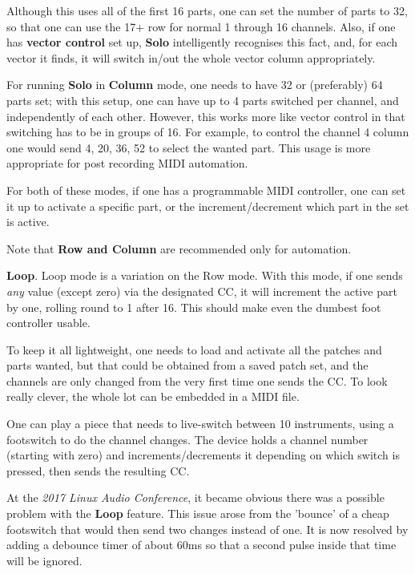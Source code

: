    Although this uses all of the first 16 parts, one can set the number of
   parts to 32, so that one can use the 17+ row for normal 1 through 16
   channels. Also, if one has \textbf{vector control} set up, \textbf{Solo}
   intelligently recognises this fact, and, for each vector it finds, it will
   switch in/out the whole vector column appropriately.

   For running \textbf{Solo} in \textbf{Column} mode, one needs to have 32 or
   (preferably) 64 parts set; with this setup, one can have up to 4 parts
   switched per channel, and independently of each other. However, this works
   more like vector control in that switching has to be in groups of 16. For
   example, to control the channel 4 column one would send 4, 20, 36, 52 to
   select the wanted part. This usage is more appropriate for post recording
   MIDI automation.

   For both of these modes, if one has a programmable MIDI controller, one can
   set it up to activate a specific part, or the increment/decrement which part
   in the set is active.

   Note that \textbf{Row and Column} are recommended only for automation.

   \textbf{Loop}.  Loop mode is a variation on the Row mode.
   With this mode, if one sends \textsl{any} value (except zero)
   via the designated CC,
   it will increment the active part by one, rolling round to 1 after 16.
   This should make even the dumbest foot controller usable.

   To keep it all lightweight, one needs to load and activate all the patches
   and parts wanted, but that could be obtained from a saved patch set, and the
   channels are only changed from the very first time one sends the CC.  To
   look really clever, the whole lot can be embedded in a MIDI file.

   One can play a piece that needs to live-switch between 10 instruments, using
   a footswitch to do the channel changes. The device holds a channel
   number (starting with zero) and increments/decrements it depending on which
   switch is pressed, then sends the resulting CC.

   At the \textsl{2017 Linux Audio Conference},
   it became obvious there was a possible problem with the \textbf{Loop}
   feature. This issue arose from the 'bounce' of a cheap footswitch that would
   then send two changes instead of one. It is now resolved by adding a
   debounce timer of about 60ms so that a second pulse inside that time will be
   ignored.

